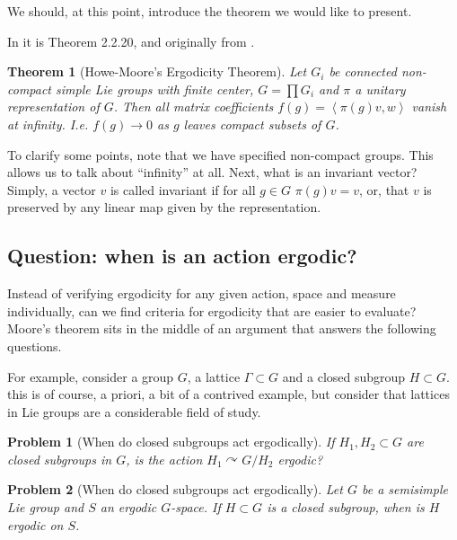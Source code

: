 \documentclass[
  12pt
]{article}
\theoremstyle{break}
\newtheorem{thm}{Theorem}[section]
\newtheorem*{problem}{Problem}
\theoremstyle{plain}
\newcommand{\G}{\ensuremath{G}\xspace}
\newcommand{\inn}[1]{\left\langle #1 \right\rangle}
\begin{document}
  We should, at this point, introduce the theorem we would like to present.

  In \citeauthor{Zimmer84}\cite{Zimmer84} it is Theorem 2.2.20, and originally from \citeauthor{howe79}\cite{howe79}.

  \begin{thm}[Howe-Moore's Ergodicity Theorem]
    \label{thm:main-thm}
    Let $G_i$ be connected non-compact simple Lie groups with finite center, $G = \prod G_i$ and $\pi$ a unitary representation of \G.
    Then all matrix coefficients $f(g) = \inn{\pi(g)v,w}$ vanish at infinity.
    I.e. $f(g) \rightarrow 0$ as $g$ leaves compact subsets of \G.
  \end{thm}

  To clarify some points, note that we have specified non-compact groups.
  This allows us to talk about ``infinity'' at all. Next, what is an
  invariant vector? Simply, a vector $v$ is called invariant if for all $g\in G$
  $\pi(g)v = v$, or, that $v$ is preserved by any linear map
  given by the representation.

  \hypertarget{question-when-is-an-action-ergodic}{%
  \subsection{Question: when is an action
  ergodic?}\label{question-when-is-an-action-ergodic}}

  Instead of verifying ergodicity for any given action, space and measure
  individually, can we find criteria for ergodicity that are easier to
  evaluate? Moore's theorem sits in the middle of an argument that
  answers the following questions.

  For example, consider a group \G, a lattice $\Gamma \subset G$ and a closed subgroup $H \subset G$.
  this is of course, a priori, a bit of a contrived example, but consider that lattices in Lie groups are a considerable field of study.

  \begin{problem}[When do closed subgroups act ergodically]
    If $H_1, H_2 \subset G$ are closed subgroups in \G, is the action $H_1\curvearrowright G/H_2$ ergodic?
  \end{problem}

  \begin{problem}[When do closed subgroups act ergodically]
    Let \G be a semisimple Lie group and $S$ an ergodic \G-space. If $H\subset G$ is a closed subgroup, when is $H$ ergodic on $S$.
  \end{problem}
\end{document}
